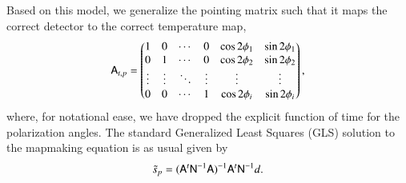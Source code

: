 \documentclass{aa}
\newcommand{\A}[0]{\tens{A}}
\newcommand{\N}[0]{\tens{N}}
\begin{document}
Based on this model, we generalize the pointing matrix such that it maps the correct detector to the correct temperature map,
\begin{equation}
\A_{t,p} = \begin{pmatrix}
1 & 0 & \cdots & 0 & \cos2\phi_1 & \sin2\phi_1 \\
0 & 1 & \cdots & 0 & \cos2\phi_2 & \sin2\phi_2 \\
\vdots & \vdots & \ddots & \vdots & \vdots & \vdots \\
0 & 0 & \cdots & 1 & \cos2\phi_i & \sin2\phi_i \\
\end{pmatrix},
\end{equation}
where, for notational ease, we have dropped the explicit function of time for the polarization angles. The standard Generalized Least Squares (GLS) solution to the mapmaking equation is as usual given by
\begin{equation}
\tilde{s}_p = (\A^t \N^{-1}\A)^{-1} \A^t\N^{-1}d.
\label{eq:gls}
\end{equation}
\end{document}
